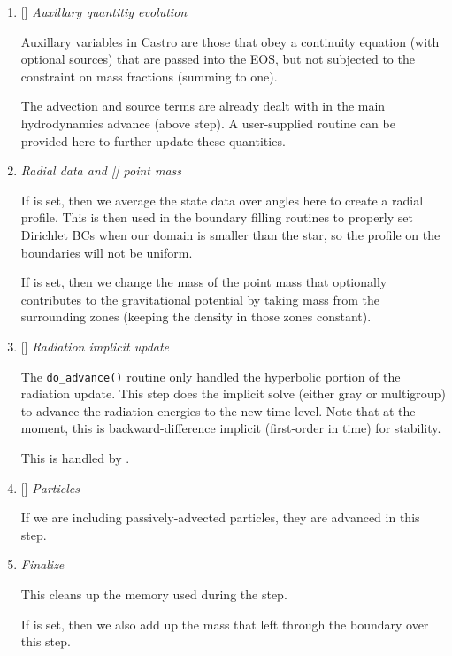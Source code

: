 \begin{enumerate}
\item {[]} {\em Auxillary quantitiy evolution} 

  Auxillary variables in Castro are those that obey a continuity
  equation (with optional sources) that are passed into the EOS, but
  not subjected to the constraint on mass fractions (summing to one).

  The advection and source terms are already dealt with in the 
  main hydrodynamics advance (above step).  A user-supplied routine
   can be provided here to further update these
  quantities.
  
\item {\em Radial data and {\rm[]} point mass} 

  If  is set, then we average the state data
  over angles here to create a radial profile.  This is then used in the 
  boundary filling routines to properly set Dirichlet BCs when our domain
  is smaller than the star, so the profile on the boundaries will not 
  be uniform.

  If  is set, then we
  change the mass of the point mass that optionally contributes to the
  gravitational potential by taking mass from the surrounding zones
  (keeping the density in those zones constant).

\item {[]} {\em Radiation implicit update} 

  The {\tt do\_advance()} routine only handled the hyperbolic
  portion of the radiation update.  This step does the implicit solve
  (either gray or multigroup) to advance the radiation energies to the 
  new time level.  Note that at the moment, this is backward-difference
  implicit (first-order in time) for stability.

  This is handled by .

\item {[]} {\em Particles} 

  If we are including passively-advected particles, they are
  advanced in this step.

\item {\em Finalize}

  This cleans up the memory used during the step.  

  If  is set, then we also add up
  the mass that left through the boundary over this
  step. 

\end{enumerate}

